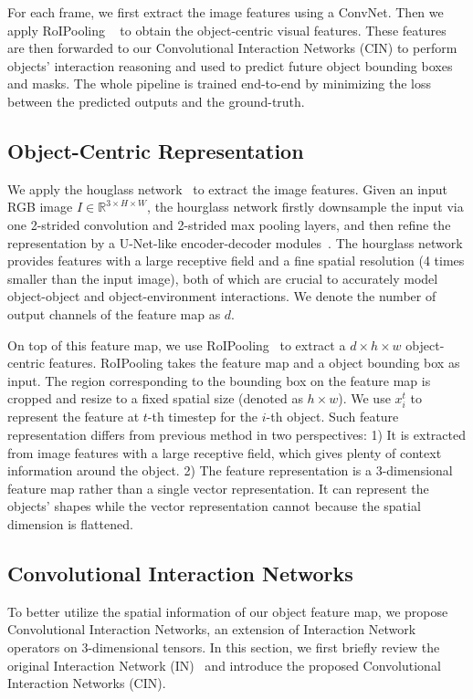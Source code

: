 \documentclass{article} \usepackage{iclr2021_conference,times}
\newcommand{\imh}{H}
\newcommand{\imw}{W}
\newcommand{\featdim}{d}
\begin{document}
For each frame, we first extract the image features using a ConvNet. Then we apply RoIPooling ~\citep{girshick2015fast,he2017mask} to obtain the object-centric visual features.
These features are then forwarded to our Convolutional Interaction Networks (CIN) to perform objects' interaction reasoning and used to predict future object bounding boxes and masks.
The whole pipeline is trained end-to-end by minimizing the loss between the predicted outputs and the ground-truth.

\vspace{-0.5em}
\subsection{Object-Centric Representation}
\vspace{-0.5em}
We apply the houglass network~\citep{newell2016stacked} to extract the image features. Given an input RGB image $I \in \mathbb{R}^{3 \times \imh \times \imw}$, the hourglass network firstly downsample the input via one 2-strided convolution and 2-strided max pooling layers, and then refine the representation by a U-Net-like encoder-decoder modules~\citep{ronneberger2015u}. The hourglass network provides features with a large receptive field and a fine spatial resolution (4 times smaller than the input image), both of which are crucial to accurately model object-object and object-environment interactions. We denote the number of output channels of the feature map as $\featdim$.

On top of this feature map, we use RoIPooling~\citep{girshick2015fast} to extract a $\featdim \times h \times w$ object-centric features. RoIPooling takes the feature map and a object bounding box as input. The region corresponding to the bounding box on the feature map is cropped and resize to a fixed spatial size (denoted as $h \times w$). We use $x_{i}^t$ to represent the feature at $t$-th timestep for the $i$-th object. Such feature representation differs from previous method in two perspectives: 1) It is extracted from image features with a large receptive field, which gives plenty of context information around the object. 2) The feature representation is a 3-dimensional feature map rather than a single vector representation. It can represent the objects' shapes while the vector representation cannot because the spatial dimension is flattened.

\vspace{-0.5em}
\subsection{Convolutional Interaction Networks}
\vspace{-0.5em}
To better utilize the spatial information of our object feature map, we propose Convolutional Interaction Networks, an extension of Interaction Network operators on 3-dimensional tensors. In this section, we first briefly review the original Interaction Network (IN)~\citep{battaglia2016interaction, watters2017visual} and introduce the proposed Convolutional Interaction Networks (CIN). 
\end{document}
